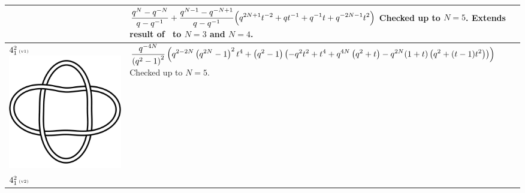 \documentclass{compositio}
\theoremstyle{definition}
\numberwithin{equation}{section}
\begin{document}
{\begin{longtable}{p{}|p{}}
& 
$
\displaystyle{%
\frac{q^N-q^{-N}}{q-q^{-1}} + \frac{q^{N-1}-q^{-N+1}}{q-q^{-1}}  \Big( q^{2N+1} t^{-2} + q t^{-1} + q^{-1} t + q^{-2N-1} t^2 \Big)
}
$
\newline\newline\newline\newline
Checked up to $N=5$. Extends result of~\cite{r0508510} to $N=3$ and $N=4$. 
\\
\hline
$4_{1}^2\,\text{{\tiny (v1)}}$ 
\includegraphics[scale=0.07,angle=0]{link4_1_2.pdf} 
& 
$
\displaystyle{%
\frac{q^{-4 N}}{\left(q^2 - 1\right)^2} \left(q^{2-2 N} \left(q^{2 N}-1\right)^2 t^4+\left(q^2 - 1\right) \left(-q^2 t^2+t^4+q^{4 N} \left(q^2+t\right)-q^{2 N} (1+t) \left(q^2+(t-1) t^2\right)\right)\right) 
}
$
\newline\newline\newline\newline
Checked up to $N=5$.
\\
\hline
$4_{1}^2\,\text{{\tiny (v2)}}$ 

\end{longtable}}
\end{document}
